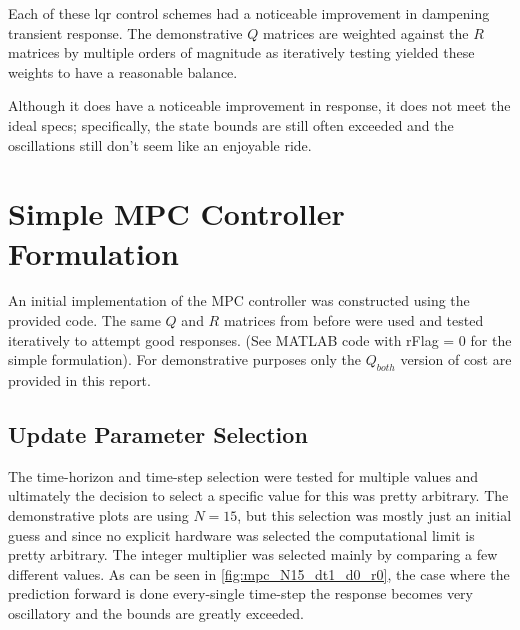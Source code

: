 \documentclass[onecolumn]{IEEEtran}
\begin{document}
Each of these lqr control schemes had a noticeable improvement in dampening transient response.
The demonstrative $Q$ matrices are weighted against the $R$ matrices by multiple orders of magnitude as iteratively testing yielded these weights to have a reasonable balance.

Although it does have a noticeable improvement in response, it does not meet the ideal specs; specifically, the state bounds are still often exceeded and the oscillations still don't seem like an enjoyable ride.

\newpage
\section{Simple MPC Controller Formulation}
An initial implementation of the MPC controller was constructed using the provided code.
The same $Q$ and $R$ matrices from before were used and tested iteratively to attempt good responses.
(See MATLAB code with rFlag = 0 for the simple formulation).
For demonstrative purposes only the $Q_{both}$ version of cost are provided in this report.

\subsection{Update Parameter Selection}
The time-horizon and time-step selection were tested for multiple values and ultimately the decision to select a specific value for this was pretty arbitrary.
The demonstrative plots are using $N=15$, but this selection was mostly just an initial guess and since no explicit hardware was selected the computational limit is pretty arbitrary.
The integer multiplier was selected mainly by comparing a few different values.
As can be seen in \autoref{fig:mpc_N15_dt1_d0_r0}, the case where the prediction forward is done every-single time-step the response becomes very oscillatory and the bounds are greatly exceeded.
\end{document}
